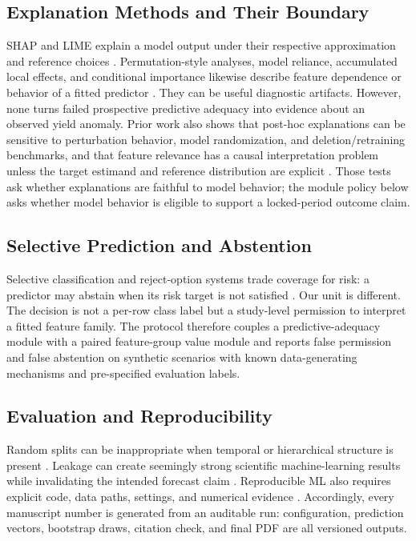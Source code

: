 \documentclass[conference]{IEEEtran}
\begin{document}
\subsection{Explanation Methods and Their Boundary}
SHAP and LIME explain a model output under their respective approximation and
reference choices \cite{LundbergLee2017,Ribeiro2016}. Permutation-style analyses,
model reliance, accumulated local effects, and conditional importance likewise
describe feature dependence or behavior of a fitted predictor
\cite{Fisher2019,ApleyZhu2020,Strobl2008}. They can be useful diagnostic artifacts.
However, none turns failed prospective predictive adequacy into evidence about an
observed yield anomaly. Prior work also shows that post-hoc explanations can be
sensitive to perturbation behavior, model randomization, and deletion/retraining
benchmarks, and that feature relevance has a causal interpretation problem unless
the target estimand and reference distribution are explicit
\cite{Adebayo2018,Hooker2019,Yeh2019,Slack2020,Janzing2020}. Those tests ask
whether explanations are faithful to model behavior; the module policy below asks
whether model behavior is eligible to support a locked-period outcome claim.

\subsection{Selective Prediction and Abstention}
Selective classification and reject-option systems trade coverage for risk:
a predictor may abstain when its risk target is not satisfied
\cite{ElYanivWiener2010,GeifmanElYaniv2017}. Our unit is different. The decision
is not a per-row class label but a study-level permission to interpret a fitted
feature family. The protocol therefore couples a predictive-adequacy module with a
paired feature-group value module and reports false permission and false abstention
on synthetic scenarios with known data-generating mechanisms and pre-specified
evaluation labels.

\subsection{Evaluation and Reproducibility}
Random splits can be inappropriate when temporal or hierarchical structure is
present \cite{Roberts2017}. Leakage can create seemingly strong scientific
machine-learning results while invalidating the intended forecast claim
\cite{KapoorNarayanan2023}. Reproducible ML also requires explicit code, data
paths, settings, and numerical evidence \cite{Pineau2021}. Accordingly, every
manuscript number is generated from an auditable run: configuration, prediction
vectors, bootstrap draws, citation check, and final PDF are all versioned outputs.
\end{document}
